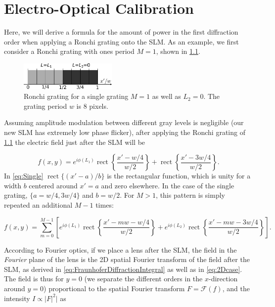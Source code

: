 \chapter{Electro-Optical Calibration}\label{ch:ElectroOptical}

Here, we will derive a formula for the amount of power in the first diffraction order when applying a Ronchi grating onto the SLM.
As an example, we first consider a Ronchi grating with ones period $M=1$, shown in \cref{fig:OneGrating}.

\begin{figure}[h]
    \centering
    \includegraphics[width=0.42\textwidth]{figures/OneGrating.pdf}
    \caption{Ronchi grating for a single grating $M=1$ as well as $L_2=0$. The grating period $w$ is 8 pixels.}
    \label{fig:OneGrating}
\end{figure}

\noindent Assuming amplitude modulation between different gray levels is negligible (our new SLM has extremely low phase flicker), after applying the Ronchi grating of \cref{fig:OneGrating} the electric field just after the SLM will be

\begin{equation}\label{eq:Single}
    f(x,y) = e^{i\phi(L_1)} \operatorname{rect} \left\{ 
    \frac{x'-w/4}{w/2}\right\} +
    \operatorname{rect}\left\{ \frac{x'-3w/4}{w/2}\right\}.
\end{equation}
In \cref{eq:Single} $\operatorname{rect}\{(x'-a)/b\}$ is the rectangular function, which is unity for a width $b$ centered around $x'=a$ and zero elsewhere.
In the case of the single grating, $\{a=w/4, 3w/4\}$ and $b=w/2$.
For $M>1$, this pattern is simply repeated an additional $M-1$ times: \cite{Zhang1994}

\begin{equation}\label{eq:FieldAfterSLM}
    f(x,y) = \sum_{m=0}^{M-1} \left[
    e^{i \phi(L_1)} \operatorname{rect}\left\{\frac{x'-m w - w/4}{w/2}\right\} + 
    e^{i \phi(L_2)}\operatorname{rect}\left\{\frac{x'- m w - 3 w/4}{w/2}\right\}
    \right].
\end{equation}

\noindent According to Fourier optics, if we place a lens after the SLM, the field in the \textit{Fourier} plane of the lens is the 2D spatial Fourier transform of the field after the SLM, as derived in \cref{eq:FraunhoferDiffractionIntegral} as well as in \cref{eq:2Dcase}.
The field is thus for $y=0$ (we separate the different orders in the $x$-direction around $y=0$) proportional to the spatial Fourier transform $F = \mathcal{F}(f)$, and the intensity $I\propto |F|^2|$ as \cite{Zhang1994}

